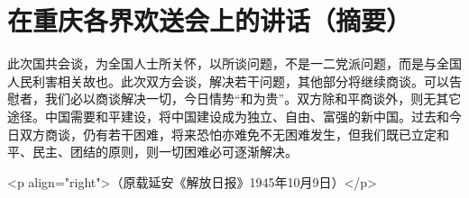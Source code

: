 \section[在重庆各界欢送会上的讲话（摘要）（一九四五年十月八日）]{在重庆各界欢送会上的讲话（摘要）}


此次国共会谈，为全国人士所关怀，以所谈问题，不是一二党派问题，而是与全国人民利害相关故也。此次双方会谈，解决若干问题，其他部分将继续商谈。可以告慰者，我们必以商谈解决一切，今日情势“和为贵”。双方除和平商谈外，则无其它途径。中国需要和平建设，将中国建设成为独立、自由、富强的新中国。过去和今日双方商谈，仍有若干困难，将来恐怕亦难免不无困难发生，但我们既已立定和平、民主、团结的原则，则一切困难必可逐渐解决。

<p align="right">（原载延安《解放日报》1945年10月9日）</p>

